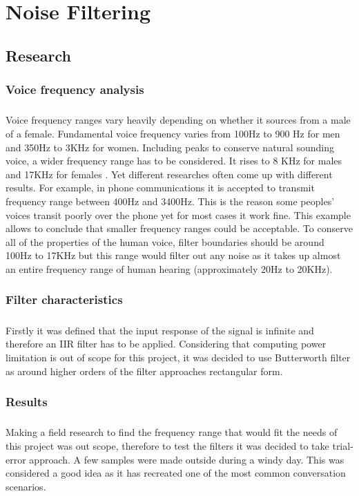 \chapter{Noise Filtering}\label{NoiseFiltering}
\section{Research}
\subsection{Voice frequency analysis}
\paragraph{} Voice frequency ranges vary heavily depending on whether it sources from a male of a female. Fundamental voice frequency varies from 100Hz to 900 Hz for men and 350Hz to 3KHz for women. Including peaks to conserve natural sounding voice, a wider frequency range has to be considered. It rises to 8 KHz for males and 17KHz for females \cite{Seaindia}. Yet different researches often come up with different results. For example, in phone communications it is accepted to transmit frequency range between 400Hz and 3400Hz. This is the reason some peoples' voices transit poorly over the phone yet for most cases it work fine. This example allows to conclude that smaller frequency ranges could be acceptable. To conserve all of the properties of the human voice, filter boundaries should be around 100Hz to 17KHz but this range would filter out any noise as it takes up almost an entire frequency range of human hearing (approximately 20Hz to 20KHz).  
\subsection{Filter characteristics}
\paragraph{} Firstly it was defined that the input response of the signal is infinite and therefore an IIR filter has to be applied. Considering that computing power limitation is out of scope for this project, it was decided to use Butterworth filter as around higher orders of the filter approaches rectangular form.  
\subsection{Results}
\paragraph{} Making a field research to find the frequency range that would fit the needs of this project was out scope, therefore to test the filters it was decided to take trial-error approach. A few samples were made outside during a windy day. This was considered a good idea as it has recreated one of the most common conversation scenarios.
